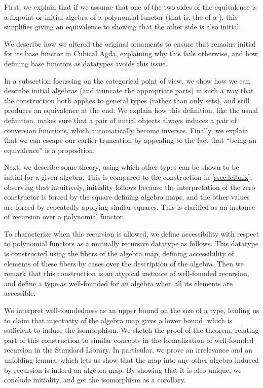 \documentclass[10pt]{article}
\theoremstyle{plain}
\theoremstyle{definition}
\begin{document}
First, we explain that if we assume that one of the two sides of the equivalence is a fixpoint or initial algebra of a polynomial functor (that is, the  of a ), this simplifies giving an equivalence to showing that the other side is also initial.

We describe how we altered the original ornaments \cite{progorn} to ensure that  remains initial for its base functor in Cubical Agda, explaining why this fails otherwise, and how defining base functors as datatypes avoids this issue.

In a subsection focussing on the categorical point of view, we show how we can describe initial algebras (and truncate the appropriate parts) in such a way that the construction both applies to general types (rather than only sets), and still produces an equivalence at the end. We explain how this definition, like the usual definition, makes sure that a pair of initial objects always induces a pair of conversion functions, which automatically become inverses. Finally, we explain that we can escape our earlier truncation by appealing to the fact that ``being an equivalence'' is a proposition.

Next, we describe some theory, using which other types can be shown to be initial for a given algebra. This is compared to the construction in \autoref{ssec:leibniz}, observing that intuitively, initiality follows because the interpretation of the zero constructor is forced by the square defining algebra maps, and the other values are forced by repeatedly applying similar squares. This is clarified as an instance of recursion over a polynomial functor.

To characterize when this recursion is allowed, we define accessibility with respect to polynomial functors as a mutually recursive datatype as follows. This datatype is constructed using the fibers of the algebra map, defining accessibility of elements of these fibers by cases over the description of the algebra. Then we remark that this construction is an atypical instance of well-founded recursion, and define a type as well-founded for an algebra when all its elements are accessible.

We interpret well-foundedness as an upper bound on the size of a type, leading us to claim that injectivity of the algebra map gives a lower bound, which is sufficient to induce the isomorphism. We sketch the proof of the theorem, relating part of this construction to similar concepts in the formalization of well-founded recursion in the Standard Library. In particular, we prove an irrelevance and an unfolding lemma, which lets us show that the map into any other algebra induced by recursion is indeed an algebra map. By showing that it is also unique, we conclude initiality, and get the isomorphism as a corollary. 
\end{document}
